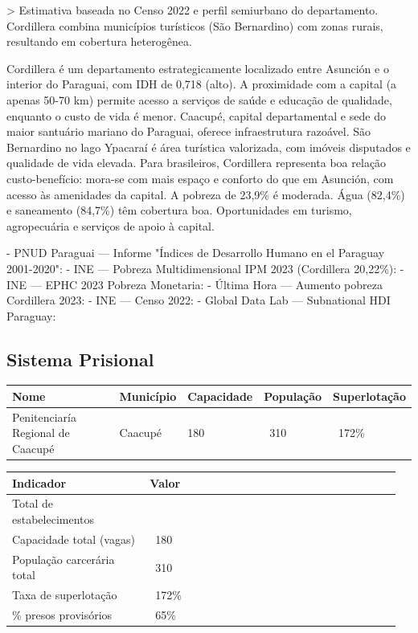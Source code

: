 > Estimativa baseada no Censo 2022 e perfil semiurbano do departamento. Cordillera combina municípios turísticos (São Bernardino) com zonas rurais, resultando em cobertura heterogênea.


Cordillera é um departamento estrategicamente localizado entre Asunción e o interior do Paraguai, com IDH de 0,718 (alto). A proximidade com a capital (a apenas 50-70 km) permite acesso a serviços de saúde e educação de qualidade, enquanto o custo de vida é menor. Caacupé, capital departamental e sede do maior santuário mariano do Paraguai, oferece infraestrutura razoável. São Bernardino no lago Ypacaraí é área turística valorizada, com imóveis disputados e qualidade de vida elevada. Para brasileiros, Cordillera representa boa relação custo-benefício: mora-se com mais espaço e conforto do que em Asunción, com acesso às amenidades da capital. A pobreza de 23,9\% é moderada. Água (82,4\%) e saneamento (84,7\%) têm cobertura boa. Oportunidades em turismo, agropecuária e serviços de apoio à capital.


- PNUD Paraguai --- Informe "Índices de Desarrollo Humano en el Paraguay 2001-2020": 
- INE --- Pobreza Multidimensional IPM 2023 (Cordillera 20,22\%): 
- INE --- EPHC 2023 Pobreza Monetaria: 
- Última Hora --- Aumento pobreza Cordillera 2023: 
- INE --- Censo 2022: 
- Global Data Lab --- Subnational HDI Paraguay: 


\subsection{Sistema Prisional}



{\small
\setlength{\tabcolsep}{3pt}
\renewcommand{\arraystretch}{1.12}
{\small
\begin{tabularx}{\linewidth}{lXXXX}
\toprule
Nome & Município & Capacidade & População & Superlotação \\
\midrule
Penitenciaría Regional de Caacupé & Caacupé & 180 & ~310 & ~172\% \\
\bottomrule
\end{tabularx}
}
}


{\small
\setlength{\tabcolsep}{3pt}
\renewcommand{\arraystretch}{1.12}
\begin{tabularx}{\linewidth}{>{\raggedright\arraybackslash}p{0.34\linewidth} >{\raggedright\arraybackslash}p{0.62\linewidth}}
\toprule
Indicador & Valor \\
\midrule
Total de estabelecimentos & 1 \\
Capacidade total (vagas) & ~180 \\
População carcerária total & ~310 \\
Taxa de superlotação & ~172\% \\
\% presos provisórios & ~65\% \\
\bottomrule
\end{tabularx}
}


